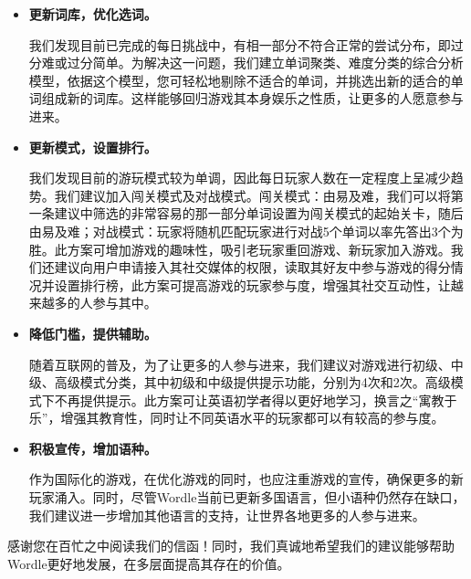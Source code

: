 \documentclass{MathModeling}
\begin{document}
	\begin{itemize}
		\item \textbf{更新词库，优化选词。}
		
		我们发现目前已完成的每日挑战中，有相一部分不符合正常的尝试分布，即过分难或过分简单。为解决这一问题，我们建立单词聚类、难度分类的综合分析模型，依据这个模型，您可轻松地剔除不适合的单词，并挑选出新的适合的单词组成新的词库。这样能够回归游戏其本身娱乐之性质，让更多的人愿意参与进来。
		\item \textbf{更新模式，设置排行。}
		
		我们发现目前的游玩模式较为单调，因此每日玩家人数在一定程度上呈减少趋势。我们建议加入闯关模式及对战模式。闯关模式：由易及难，我们可以将第一条建议中筛选的非常容易的那一部分单词设置为闯关模式的起始关卡，随后由易及难；对战模式：玩家将随机匹配玩家进行对战5个单词以率先答出3个为胜。此方案可增加游戏的趣味性，吸引老玩家重回游戏、新玩家加入游戏。我们还建议向用户申请接入其社交媒体的权限，读取其好友中参与游戏的得分情况并设置排行榜，此方案可提高游戏的玩家参与度，增强其社交互动性，让越来越多的人参与其中。
		\item \textbf{降低门槛，提供辅助。}
		
		随着互联网的普及，为了让更多的人参与进来，我们建议对游戏进行初级、中级、高级模式分类，其中初级和中级提供提示功能，分别为4次和2次。高级模式下不再提供提示。此方案可让英语初学者得以更好地学习，换言之“寓教于乐”，增强其教育性，同时让不同英语水平的玩家都可以有较高的参与度。
		\item \textbf{积极宣传，增加语种。}
		
		作为国际化的游戏，在优化游戏的同时，也应注重游戏的宣传，确保更多的新玩家涌入。同时，尽管Wordle当前已更新多国语言，但小语种仍然存在缺口，我们建议进一步增加其他语言的支持，让世界各地更多的人参与进来。
	\end{itemize}
	
	感谢您在百忙之中阅读我们的信函！同时，我们真诚地希望我们的建议能够帮助Wordle更好地发展，在多层面提高其存在的价值。

	~\\



	\newpage
\end{document}
